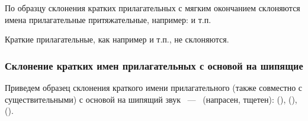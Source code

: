 \documentclass[11pt,a4paper,oneside]{memoir}
\begin{document}
    По образцу склонения кратких прилагательных с мягким окончанием склоняются имена прилагательные притяжательные, например: {} и т.п.
    
    Краткие прилагательные, как например {} и т.п., не склоняются.

                \subsubsection{Склонение кратких имен прилагательных с основой на шипящие}

    Приведем образец склонения краткого имени прилагательного (также совместно с существительными) с основой на шипящий звук {}~---~{} (напрасен, тщетен): {} ({}), {} ({}), {} ({}).
    
\end{document}

